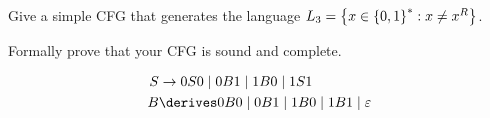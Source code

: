 \begin{problem}
  Give a simple CFG that generates the language
  $L_3 = \left\{x \in \left\{0, 1\right\}^* : x \ne x^R\right\}$.

  \step
  Formally prove that your CFG is sound and complete.
\end{problem}
\begin{Answer}
  \begin{align*}
    S &\to 0S0 \mid 0B1 \mid 1B0 \mid 1S1 \\
    B &\derives 0B0 \mid 0B1 \mid 1B0 \mid 1B1 \mid \eps
  \end{align*}
\end{Answer}
